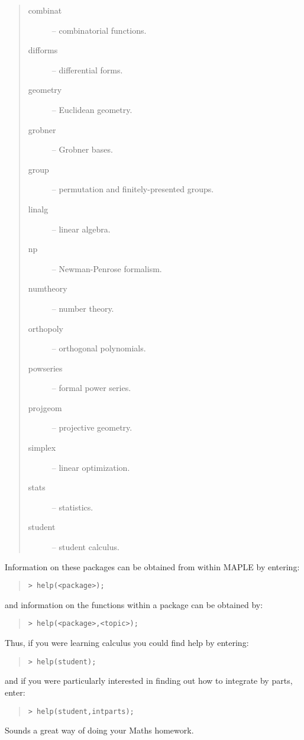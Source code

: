\documentclass[twoside,11pt]{article}
\begin{document}
\begin{quote}
\begin{description}

\item [combinat] -- combinatorial functions.
\item [difforms] -- differential forms.
\item [geometry] -- Euclidean geometry.
\item [grobner] -- Grobner bases.
\item [group] -- permutation and finitely-presented groups.
\item [linalg] -- linear algebra.
\item [np] -- Newman-Penrose formalism.
\item [numtheory] -- number theory.
\item [orthopoly] -- orthogonal polynomials.
\item [powseries] -- formal power series.
\item [projgeom] -- projective geometry.
\item [simplex] -- linear optimization.
\item [stats] -- statistics.
\item [student] -- student calculus.

\end{description}
\end{quote}

Information on these packages can be obtained from within MAPLE by
entering:

\begin{quote}\begin{verbatim}
> help(<package>);
\end{verbatim}\end{quote}

and information on the functions within a package can be obtained by:

\begin{quote}\begin{verbatim}
> help(<package>,<topic>);
\end{verbatim}\end{quote}

Thus, if you were learning calculus you could find help by entering:

\begin{quote}\begin{verbatim}
> help(student);
\end{verbatim}\end{quote}

and if you were particularly interested in finding out how to integrate
by parts, enter:

\begin{quote}\begin{verbatim}
> help(student,intparts);
\end{verbatim}\end{quote}

Sounds a great way of doing your Maths homework.

\end{document}
